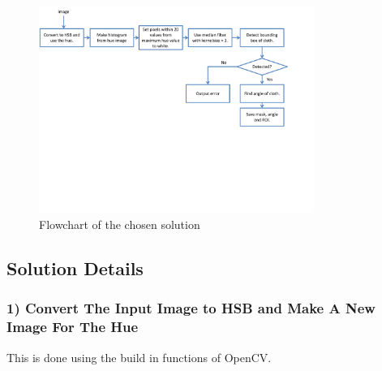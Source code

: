 
\begin{figure}[htpb]
\begin{center}
\leavevmode
\includegraphics[width=0.8\textwidth]{images/tabledetect_flowchart}
\end{center}
\caption{Flowchart of the chosen solution}
\label{fig:tabledetect_flowchart}
\end{figure}

\subsection{Solution Details}
\subsubsection{1) Convert The Input Image to HSB and Make A New Image For The Hue}
This is done using the build in functions of OpenCV.

